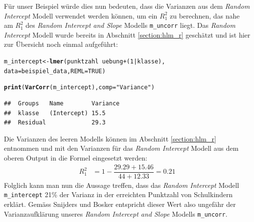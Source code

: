 \documentclass[12pt]{article}\usepackage[]{graphicx}\usepackage[]{color}
\makeatletter
\newcommand{\hlnum}[1]{\textcolor[rgb]{0.686,0.059,0.569}{#1}}%
\newcommand{\hlstr}[1]{\textcolor[rgb]{0.192,0.494,0.8}{#1}}%
\newcommand{\hlopt}[1]{\textcolor[rgb]{0,0,0}{#1}}%
\newcommand{\hlstd}[1]{\textcolor[rgb]{0.345,0.345,0.345}{#1}}%
\newcommand{\hlkwb}[1]{\textcolor[rgb]{0.69,0.353,0.396}{#1}}%
\newcommand{\hlkwc}[1]{\textcolor[rgb]{0.333,0.667,0.333}{#1}}%
\newcommand{\hlkwd}[1]{\textcolor[rgb]{0.737,0.353,0.396}{\textbf{#1}}}%
\newenvironment{kframe}{%
 \def\at@end@of@kframe{}%
 \ifinner\ifhmode%
  \def\at@end@of@kframe{\end{minipage}}%
  \begin{minipage}{\columnwidth}%
 \fi\fi%
 \def\FrameCommand##1{\hskip\@totalleftmargin \hskip-\fboxsep
 \colorbox{shadecolor}{##1}\hskip-\fboxsep
     \hskip-\linewidth \hskip-\@totalleftmargin \hskip\columnwidth}%
 \MakeFramed {\advance\hsize-\width
   \@totalleftmargin\z@ \linewidth\hsize
   \@setminipage}}%
 {\par\unskip\endMakeFramed%
 \at@end@of@kframe}
\newenvironment{knitrout}{}{} %
\makeatother
\begin{document}
Für unser Beispiel würde dies nun bedeuten, dass die Varianzen aus dem \textit{Random Intercept} Modell verwendet werden können, um ein $R_{1}^2$ zu berechnen, das nahe am $R_{1}^2$ des \textit{Random Intercept and Slope} Modells \texttt{m\_uncorr} liegt. Das \textit{Random Intercept} Modell wurde bereits in Abschnitt \ref{section:hlm_r} geschätzt und ist hier zur Übersicht noch einmal aufgeführt:

\singlespacing
\begin{knitrout}
\color{fgcolor}\begin{kframe}
\begin{alltt}
\hlstd{m_intercept} \hlkwb{<-} \hlkwd{lmer}\hlstd{(punktzahl} \hlopt{~} \hlstd{uebung} \hlopt{+} \hlstd{(}\hlnum{1} \hlopt{|} \hlstd{klasse),}
                \hlkwc{data} \hlstd{= beispiel_data,} \hlkwc{REML} \hlstd{=} \hlnum{TRUE}\hlstd{)}

\hlkwd{print}\hlstd{(}\hlkwd{VarCorr}\hlstd{(m_intercept),} \hlkwc{comp} \hlstd{=} \hlstr{"Variance"}\hlstd{)}
\end{alltt}
\begin{verbatim}
##  Groups   Name        Variance
##  klasse   (Intercept) 15.5    
##  Residual             29.3
\end{verbatim}
\end{kframe}
\end{knitrout}



\newpage
Die Varianzen des leeren Modells können im Abschnitt \ref{section:hlm_r} entnommen und mit den Varianzen für das \textit{Random Intercept} Modell aus dem oberen Output in die Formel eingesetzt werden:
\begin{equation} 
\begin{split}	
 R_{1}^2 & = 1 - \dfrac{29.29 + 15.46}{44 + 12.33} = 0.21
\end{split}	
\end{equation}
Folglich kann man nun die Aussage treffen, dass das \textit{Random Intercept} Modell \texttt{m\_intercept} 21\% der Varianz in der erreichten Punktzahl von Schulkindern erklärt. Gemäss Snijders und Bosker \citeyearpar{SnijdersTomA.B2012Ma:a} entspricht dieser Wert also ungefähr der Varianzaufklärung unseres \textit{Random Intercept and Slope} Modells \texttt{m\_uncorr}. 
\end{document}
